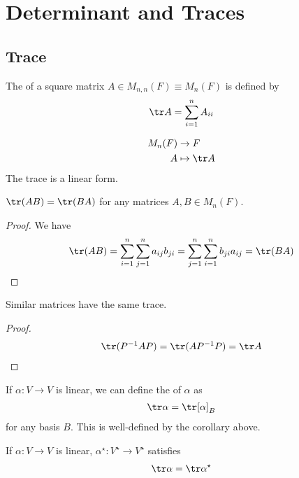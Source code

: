 \section{Determinant and Traces}

\subsection{Trace}
\begin{definition}[Trace]
	The  of a square matrix $A \in M_{n,n}(F) \equiv M_n(F)$ is defined by
	\begin{align*}
		\tr A = \sum_{i=1}^n A_{ii}
	\end{align*}
\end{definition}

\begin{remark}
    \begin{align*}
        M_n(F) &\to F \\
        A &\mapsto \tr A
    \end{align*} 
    The trace is a linear form.
\end{remark} 

\begin{lemma}
	$\tr (AB) = \tr (BA)$ for any matrices $A, B \in M_n(F)$.
\end{lemma}

\begin{proof}
	We have
	\begin{align*}
		\tr (AB) = \sum_{i=1}^n \sum_{j=1}^n a_{ij} b_{ji} = \sum_{j=1}^n \sum_{i=1}^n b_{ji} a_{ij} = \tr (BA)
	\end{align*}
\end{proof}
\begin{corollary}
	Similar matrices have the same trace.
\end{corollary}
\begin{proof}
	\begin{align*}
		\tr(P^{-1}AP) = \tr (A P^{-1} P) = \tr A
	\end{align*}
\end{proof}
\begin{definition}
	If $\alpha \colon V \to V$ is linear, we can define the  of $\alpha$ as
	\begin{align*}
		\tr \alpha = \tr [\alpha]_B
	\end{align*}
	for any basis $B$.
	This is well-defined by the corollary above.
\end{definition}
\begin{lemma}
	If $\alpha \colon V \to V$ is linear, $\alpha^\star \colon V^\star \to V^\star$ satisfies
	\begin{align*}
		\tr \alpha = \tr \alpha^\star
	\end{align*}
\end{lemma}

